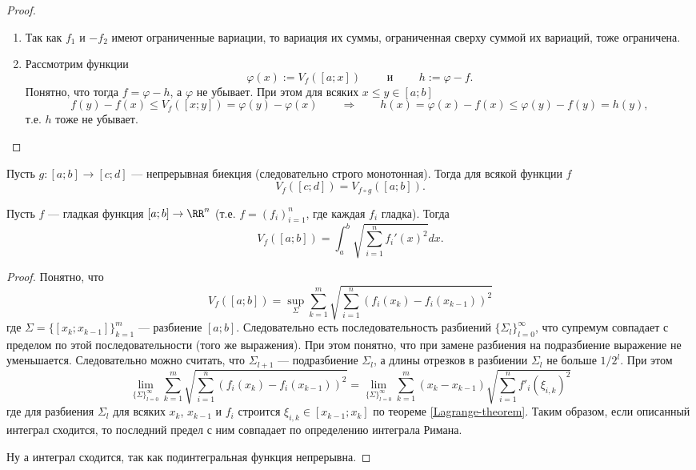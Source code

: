 \documentclass[12pt,a4paper]{article}
\begin{document}
    \begin{proof}\ 
        \begin{enumerate}
            \item Так как $f_1$ и $-f_2$ имеют ограниченные вариации, то вариация их суммы, ограниченная сверху суммой их вариаций, тоже ограничена.
            \item Рассмотрим функции
                \[\varphi(x) := V_f([a; x]) \qquad \text{ и } \qquad h := \varphi - f.\]
                Понятно, что тогда $f = \varphi - h$, а $\varphi$ не убывает. При этом для всяких $x \leqslant y \in [a; b]$
                \[
                    f(y) - f(x) \leqslant V_f([x; y]) = \varphi(y) - \varphi(x)
                    \qquad \Longrightarrow \qquad
                    h(x) = \varphi(x) - f(x) \leqslant \varphi(y) - f(y) = h(y),
                \]
                т.е. $h$ тоже не убывает.
        \end{enumerate}
    \end{proof}

    \begin{lemma}
        Пусть $g: [a; b] \to [c; d]$ --- непрерывная биекция (следовательно строго монотонная). Тогда для всякой функции $f$
        \[V_f([c; d]) = V_{f \circ g}([a; b]).\]
    \end{lemma}

    \begin{lemma}
        Пусть $f$ --- гладкая функция $[a; b] \to \RR^n$ (т.е. $f = (f_i)_{i=1}^n$, где каждая $f_i$ гладка). Тогда
        \[V_f([a; b]) = \int_a^b \sqrt{\sum_{i=1}^n f_i'(x)^2} dx.\]
    \end{lemma}

    \begin{proof}
        Понятно, что
        \[
            V_f([a; b])
            = \sup_\Sigma \sum_{k=1}^m \sqrt{\sum_{i=1}^n (f_i(x_k) - f_i(x_{k-1}))^2}
        \]
        где $\Sigma = \{[x_k; x_{k-1}]\}_{k=1}^m$ --- разбиение $[a; b]$. Следовательно есть последовательность разбиений $\{\Sigma_l\}_{l=0}^\infty$, что супремум совпадает с пределом по этой последовательности (того же выражения). При этом понятно, что при замене разбиения на подразбиение выражение не уменьшается. Следовательно можно считать, что $\Sigma_{l+1}$ --- подразбиение $\Sigma_l$, а длины отрезков в разбиении $\Sigma_l$ не больше $1/2^l$. При этом
        \[
            \lim_{\{\Sigma\}_{l=0}^\infty} \sum_{k=1}^m \sqrt{\sum_{i=1}^n (f_i(x_k) - f_i(x_{k-1}))^2}
            = \lim_{\{\Sigma\}_{l=0}^\infty} \sum_{k=1}^m (x_k - x_{k-1}) \sqrt{\sum_{i=1}^n f'_i(\xi_{i, k})^2}
        \]
        где для разбиения $\Sigma_l$ для всяких $x_k$, $x_{k-1}$ и $f_i$ строится $\xi_{i, k} \in [x_{k-1}; x_k]$ по теореме \ref{Lagrange-theorem}. Таким образом, если описанный интеграл сходится, то последний предел с ним совпадает по определению интеграла Римана.

        Ну а интеграл сходится, так как подинтегральная функция непрерывна.
    \end{proof}
\end{document}

